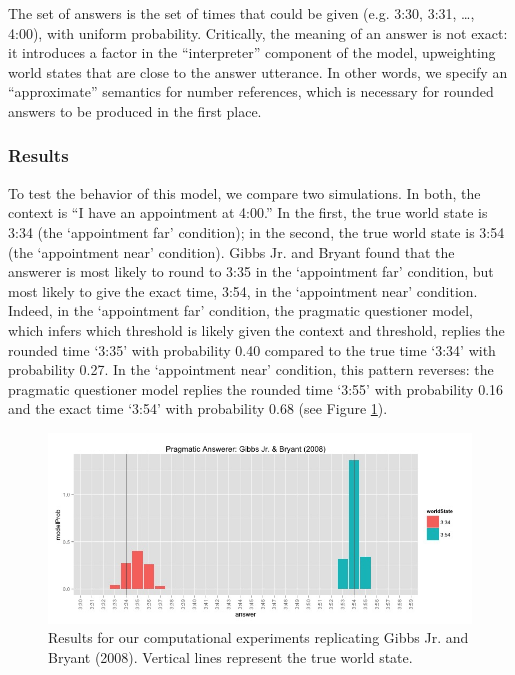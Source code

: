 \documentclass[12pt, floatsintext, jou]{apa6}
\begin{document}
 The set of answers is the set of times that could be given (e.g. 3:30, 3:31, \dots, 4:00), with uniform probability. Critically, the meaning of an answer is not exact: it introduces a factor in the ``interpreter'' component of the model, upweighting world states that are close to the answer utterance. In other words, we specify an ``approximate'' semantics for number references, which is necessary for rounded answers to be produced in the first place.
 
 
 
 \subsubsection{Results}
 
 To test the behavior of this model, we compare two simulations. In both, the context is ``I have an appointment at 4:00.'' In the first, the true world state is 3:34 (the `appointment far' condition); in the second, the true world state is 3:54 (the `appointment near' condition). Gibbs Jr. and Bryant \citeyear{GibbsBryant08_OptimalRelevance} found that the answerer is most likely to round to 3:35 in the `appointment far' condition, but most likely to give the exact time, 3:54, in the `appointment near' condition. Indeed, in the `appointment far' condition, the pragmatic questioner model, which infers which threshold is likely given the context and threshold, replies the rounded time `3:35' with probability 0.40 compared to the true time `3:34' with probability 0.27. In the `appointment near' condition, this pattern reverses: the pragmatic questioner model replies the rounded time `3:55' with probability 0.16 and the exact time `3:54' with probability 0.68 (see Figure \ref{fig:timeExperimentResults}).
 
 \begin{figure}
\begin{center}
\includegraphics[scale = .5]{timeExpResults.jpeg}
\end{center}
\vspace{-.25cm}
\caption{Results for our computational experiments replicating Gibbs Jr. and Bryant (2008). Vertical lines represent the true world state.}
\label{fig:timeExperimentResults}
\end{figure}
\end{document}

